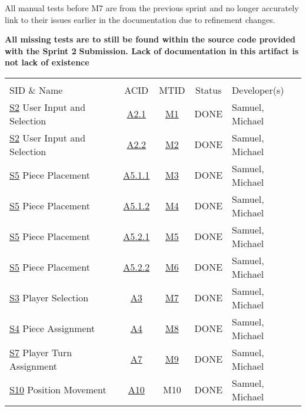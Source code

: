 \documentclass[11pt]{article}
\begin{document}
All manual tests before M7 are from the previous sprint and no longer accurately link to their
issues earlier in the documentation due to refinement changes.

\textbf{All missing tests are to still be found within the source code provided with the Sprint 2}
\textbf{Submission. Lack of documentation in this artifact is not lack of existence}

\begin{center}
\begin{tabular}{|p{4.5cm}|c|c|c|p{3.0cm}|}
 &  &  &  & \\
SID \& Name & ACID & MTID & Status & Developer(s)\\
\hline
\hyperref[sec:org7807149]{S2} User Input and Selection & \hyperref[sec:org615889e]{A2.1} & \hyperref[sec:org34bd832]{M1} & DONE & Samuel, Michael\\
\hyperref[sec:org7807149]{S2} User Input and Selection & \hyperref[sec:org615889e]{A2.2} & \hyperref[sec:org4ae36a1]{M2} & DONE & Samuel, Michael\\
\hyperref[sec:org2d34e67]{S5} Piece Placement & \hyperref[sec:orgac6d970]{A5.1.1} & \hyperref[sec:orgbcad7ac]{M3} & DONE & Samuel, Michael\\
\hyperref[sec:org2d34e67]{S5} Piece Placement & \hyperref[sec:orgac6d970]{A5.1.2} & \hyperref[sec:org12afbb2]{M4} & DONE & Samuel, Michael\\
\hyperref[sec:org2d34e67]{S5} Piece Placement & \hyperref[sec:orgac6d970]{A5.2.1} & \hyperref[sec:orgb189415]{M5} & DONE & Samuel, Michael\\
\hyperref[sec:org2d34e67]{S5} Piece Placement & \hyperref[sec:orgac6d970]{A5.2.2} & \hyperref[sec:orgc8d62ce]{M6} & DONE & Samuel, Michael\\
\hyperref[sec:orgb298c6a]{S3} Player Selection & \hyperref[sec:org9708937]{A3} & \hyperref[sec:org6694017]{M7} & DONE & Samuel, Michael\\
\hyperref[sec:orgebcc56a]{S4} Piece Assignment & \hyperref[sec:org1e77c13]{A4} & \hyperref[sec:org194582a]{M8} & DONE & Samuel, Michael\\
\hyperref[sec:org9d7b481]{S7} Player Turn Assignment & \hyperref[sec:org234e8ee]{A7} & \hyperref[sec:org363bf8a]{M9} & DONE & Samuel, Michael\\
\hyperref[sec:orge12bdd0]{S10} Position Movement & \hyperref[sec:org350b031]{A10} & M10 & DONE & Samuel, Michael\\
\end{tabular}
\end{center}
\end{document}
